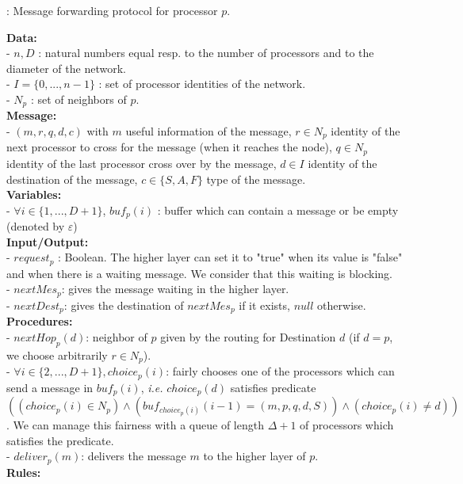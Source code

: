 \documentclass[11pt]{article}
\begin{document}
\begin{algorithm}
	\caption{\label{algo:AD}\AD : Message forwarding protocol for processor $p$.}
\small{
		\textbf{Data:}\\
			- $n,D$ : natural numbers equal resp. to the number of processors and to the diameter of the network.\\
			- $I=\{0,...,n-1\}$ : set of processor identities of the network.\\
			- $N_{p}$ : set of neighbors of $p$.\\
		\textbf{Message:}\\
			- $(m,r,q,d,c)$ with $m$ useful information of the message, $r\in N_{p}$
			identity of the next processor to cross for the message (when it reaches the node), 
			$q\in N_{p}$ identity of the last processor cross over by the message, $d\in I$ 
			identity of the destination of the message, $c\in\{S,A,F\}$ type of the message.\\
		\textbf{Variables:}\\
			- $\forall i\in\{1,...,D+1\}$, $buf_{p}(i)$ : buffer which can contain a message or be empty (denoted by $\varepsilon$)\\
		\textbf{Input/Output:}\\
			- $request_{p}$ : Boolean. The higher layer can set it to "true" when its value is "false"
			and when there is a waiting message. We consider that this waiting is blocking.\\
			- $nextMes_{p}$: gives the message waiting in the higher layer.\\
			- $nextDest_{p}$: gives the destination of $nextMes_{p}$ if it exists, $null$ otherwise.\\
		\textbf{Procedures:}\\
			- $nextHop_{p}(d)$: neighbor of $p$ given by the routing for Destination $d$ (if $d=p$, we choose arbitrarily $r\in N_{p}$).\\
			- $\forall i\in \{2,...,D+1\},choice_{p}(i)$: fairly chooses one of the processors which can send a message
			in $buf_{p}(i)$, \emph{i.e.} $choice_{p}(d)$ satisfies predicate 
			$((choice_{p}(i)\in N_{p}) \wedge (buf_{choice_{p}(i)}(i-1)=(m,p,q,d,S)) \wedge (choice_{p}(i)\neq d))$. 
			We can manage this fairness with a queue of length $\Delta+1$ of processors which satisfies the
			predicate.\\
			- $deliver_{p}(m)$: delivers the message $m$ to the higher layer
			of $p$.\\
		\textbf{Rules:}
			\begin{description}

\end{description}}
\end{algorithm}
\end{document}
